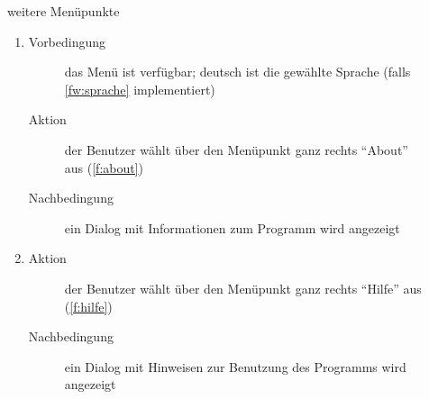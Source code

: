 \begin{description}
	\item[] weitere Menüpunkte
	\begin{enumerate}
		\item
		\begin{description}
			\item[Vorbedingung] das Menü ist verfügbar; deutsch ist die gewählte Sprache (falls \ref{fw:sprache} implementiert)
			\item[Aktion] der Benutzer wählt über den Menüpunkt ganz rechts \enquote{About} aus (\ref{f:about})
			\item[Nachbedingung] ein \gls{Dialog} mit Informationen zum Programm wird angezeigt
		\end{description}
		\item
		\begin{description}
			\item[Aktion] der Benutzer wählt über den Menüpunkt ganz rechts \enquote{Hilfe} aus (\ref{f:hilfe})
			\item[Nachbedingung] ein \gls{Dialog} mit Hinweisen zur Benutzung des Programms wird angezeigt
		\end{description}
	\end{enumerate}
\end{description}
\pagebreak
